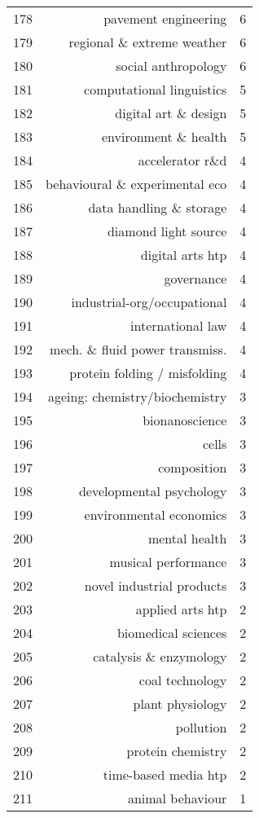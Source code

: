 \begin{spacing}{0.9}
\begin{longtable}[c]{r|r|>{\raggedleft\arraybackslash}m{2.3cm}}
{178} & {pavement engineering} & {6}\\
{179} & {regional \& extreme weather} & {6}\\
{180} & {social anthropology} & {6}\\
{181} & {computational linguistics} & {5}\\
{182} & {digital art \& design} & {5}\\
{183} & {environment \& health} & {5}\\
{184} & {accelerator r\&d} & {4}\\
{185} & {behavioural \& experimental eco} & {4}\\
{186} & {data handling \& storage} & {4}\\
{187} & {diamond light source} & {4}\\
{188} & {digital arts htp} & {4}\\
{189} & {governance} & {4}\\
{190} & {industrial-org/occupational} & {4}\\
{191} & {international law} & {4}\\
{192} & {mech. \& fluid power transmiss.} & {4}\\
{193} & {protein folding / misfolding} & {4}\\
{194} & {ageing: chemistry/biochemistry} & {3}\\
{195} & {bionanoscience} & {3}\\
{196} & {cells} & {3}\\
{197} & {composition} & {3}\\
{198} & {developmental psychology} & {3}\\
{199} & {environmental economics} & {3}\\
{200} & {mental health} & {3}\\
{201} & {musical performance} & {3}\\
{202} & {novel industrial products} & {3}\\
{203} & {applied arts htp} & {2}\\
{204} & {biomedical sciences} & {2}\\
{205} & {catalysis \& enzymology} & {2}\\
{206} & {coal technology} & {2}\\
{207} & {plant physiology} & {2}\\
{208} & {pollution} & {2}\\
{209} & {protein chemistry} & {2}\\
{210} & {time-based media htp} & {2}\\
{211} & {animal behaviour} & {1}\\

\end{longtable}
\end{spacing}
